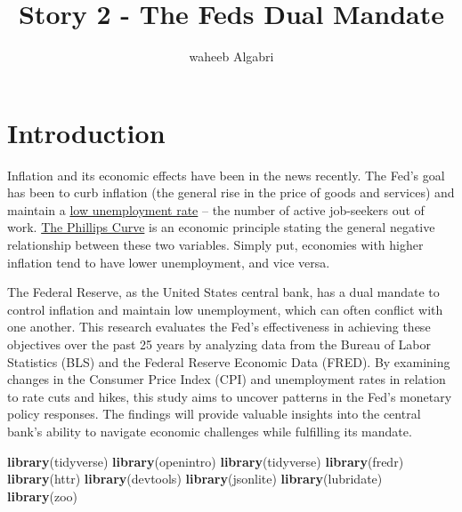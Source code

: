 \documentclass[
]{article}
\title{Story 2 - The Feds Dual Mandate}
\author{waheeb Algabri}
\date{}
\newenvironment{Shaded}{\begin{snugshade}}{\end{snugshade}}
\newcommand{\FunctionTok}[1]{\textcolor[rgb]{0.13,0.29,0.53}{\textbf{#1}}}
\newcommand{\NormalTok}[1]{#1}
\begin{document}
\maketitle

\section{Introduction}\label{introduction}

Inflation and its economic effects have been in the news recently. The
Fed's goal has been to curb inflation (the general rise in the price of
goods and services) and maintain a
\href{https://www.investopedia.com/terms/u/unemployment.asp}{low
unemployment rate} -- the number of active job-seekers out of work.
\href{https://socialsci.libretexts.org/Bookshelves/Economics/Economics_(Boundless)/23\%3A_Inflation_and_Unemployment/23.1\%3A_The_Relationship_Between_Inflation_and_Unemployment\#:~:text=The\%20Phillips\%20curve\%20shows\%20the\%20inverse\%20trade\%2Doff\%20between\%20rates,low\%2C\%20inflation\%20will\%20be\%20high.}{The
Phillips Curve} is an economic principle stating the general negative
relationship between these two variables. Simply put, economies with
higher inflation tend to have lower unemployment, and vice versa.

The Federal Reserve, as the United States central bank, has a dual
mandate to control inflation and maintain low unemployment, which can
often conflict with one another. This research evaluates the Fed's
effectiveness in achieving these objectives over the past 25 years by
analyzing data from the Bureau of Labor Statistics (BLS) and the Federal
Reserve Economic Data (FRED). By examining changes in the Consumer Price
Index (CPI) and unemployment rates in relation to rate cuts and hikes,
this study aims to uncover patterns in the Fed's monetary policy
responses. The findings will provide valuable insights into the central
bank's ability to navigate economic challenges while fulfilling its
mandate.

\begin{Shaded}
\begin{Highlighting}[]
\FunctionTok{library}\NormalTok{(tidyverse)}
\FunctionTok{library}\NormalTok{(openintro)}
\FunctionTok{library}\NormalTok{(tidyverse)}
\FunctionTok{library}\NormalTok{(fredr)}
\FunctionTok{library}\NormalTok{(httr)}
\FunctionTok{library}\NormalTok{(devtools)}
\FunctionTok{library}\NormalTok{(jsonlite)}
\FunctionTok{library}\NormalTok{(lubridate)}
\FunctionTok{library}\NormalTok{(zoo)}
\end{Highlighting}
\end{Shaded}
\end{document}
